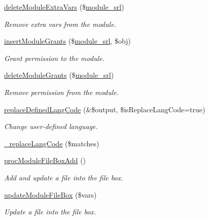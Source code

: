 \begin{DoxyCompactItemize}
\hyperlink{classmoduleController_aff9b45ce153dcad735896f56fe60516f}{delete\+Module\+Extra\+Vars} (\$\hyperlink{ko_8install_8php_a370bb6450fab1da3e0ed9f484a38b761}{module\+\_\+srl})
\begin{DoxyCompactList}\small\item\em Remove extra vars from the module. \end{DoxyCompactList}\item 
\hyperlink{classmoduleController_a551eda7765398673c806ca1def44c7ac}{insert\+Module\+Grants} (\$\hyperlink{ko_8install_8php_a370bb6450fab1da3e0ed9f484a38b761}{module\+\_\+srl}, \$obj)
\begin{DoxyCompactList}\small\item\em Grant permission to the module. \end{DoxyCompactList}\item 
\hyperlink{classmoduleController_a34f1a44321986a8f4692be393d6a5c85}{delete\+Module\+Grants} (\$\hyperlink{ko_8install_8php_a370bb6450fab1da3e0ed9f484a38b761}{module\+\_\+srl})
\begin{DoxyCompactList}\small\item\em Remove permission from the module. \end{DoxyCompactList}\item 
\hyperlink{classmoduleController_ace764298e1aee4006ecd8dbf7aaf4007}{replace\+Defined\+Lang\+Code} (\&\$output, \$is\+Replace\+Lang\+Code=true)
\begin{DoxyCompactList}\small\item\em Change user-\/defined language. \end{DoxyCompactList}\item 
\hyperlink{classmoduleController_a0d4e5ad494cacf50288a3f6e9f013a5d}{\+\_\+replace\+Lang\+Code} (\$matches)
\item 
\hyperlink{classmoduleController_a456022e1fca3a204b9b2b828b501fefb}{proc\+Module\+File\+Box\+Add} ()
\begin{DoxyCompactList}\small\item\em Add and update a file into the file box. \end{DoxyCompactList}\item 
\hyperlink{classmoduleController_af1ea81da50538369f648be26252ddd26}{update\+Module\+File\+Box} (\$vars)
\begin{DoxyCompactList}\small\item\em Update a file into the file box. \end{DoxyCompactList}\item 

\end{DoxyCompactItemize}
